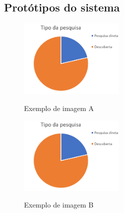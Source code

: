 %
\begin{apendicesenv}
%
\partapendices
%
\chapter{Protótipos do sistema}
\label{appendix:prototipos}
%
\begin{figure}[h]
    \caption{Exemplo de imagem A}
    \centering
    \includegraphics[width=5cm]{imagens/grafico.png}
    \label{figura:qualquernome2}
\end{figure}

\begin{figure}[h]
    \caption{Exemplo de imagem B}
    \centering
    \includegraphics[width=5cm]{imagens/grafico.png}
    \label{figura:qualquernome3}
\end{figure}
%
%
\end{apendicesenv}
%
%
